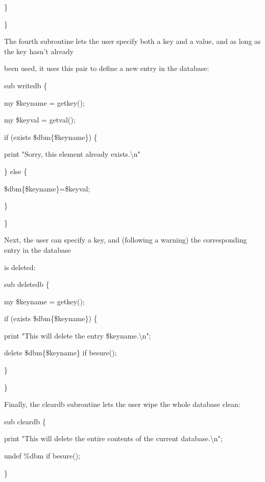 \documentclass[a4paper,11pt]{book}
\begin{document}
\noindent \}

\noindent \}

\noindent 

\noindent The fourth subroutine lets the user specify both a key and a value, and as long as the key hasn't already

\noindent been used, it uses this pair to define a new entry in the database:

\noindent 

\noindent sub writedb \{

\noindent my \$keyname = getkey();

\noindent my \$keyval = getval();

\noindent 

\noindent if (exists \$dbm\{\$keyname\}) \{

\noindent print "Sorry, this element already exists.\textbackslash n"

\noindent \} else \{

\noindent \$dbm\{\$keyname\}=\$keyval;

\noindent \}

\noindent \}

\noindent 

\noindent Next,  the user  can  specify  a key,  and  (following  a  warning)  the corresponding  entry  in  the  database

\noindent is deleted:

\noindent 

\noindent sub deletedb \{

\noindent my \$keyname = getkey();

\noindent if (exists \$dbm\{\$keyname\}) \{

\noindent print "This will delete the entry \$keyname.\textbackslash n";

\noindent delete \$dbm\{\$keyname\} if besure();

\noindent \}

\noindent \}

\noindent 

\noindent Finally, the cleardb subroutine lets the user wipe the whole database clean:

\noindent 

\noindent sub cleardb \{

\noindent print "This will delete the entire contents of the current database.\textbackslash n";

\noindent undef \%dbm if besure();

\noindent \}
\end{document}
